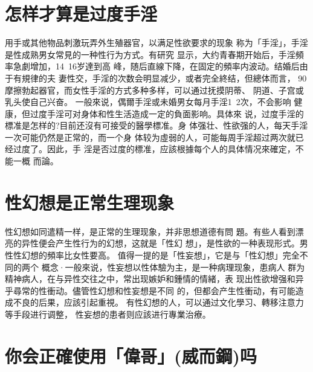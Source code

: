 \documentclass[12pt,UTF8]{ctexbook}
\begin{document}
\section{怎样才算是过度手淫}

用手或其他物品刺激玩弄外生殖器官，以满足性欲要求的现象
称为「手淫」，手淫是性成熟男女常見的一种性行为方式。有研究
显示，大约青春期开始后，手淫頻率急劇增加，14~16岁達到高
峰，随后直線下降，在固定的頻率内波动。结婚后由于有規律的夫
妻性交，手淫的次数会明显减少，或者完全終结，但總体而言，
90%
摩擦勃起器官，而女性手淫的方式多种多样，可以通过抚摸阴蒂、
阴道、子宫或乳头使自己兴奋。
一般來说，偶爾手淫或未婚男女每月手淫1~2次，不会影响
健康，但过度手淫可对身体和性生活造成一定的負面影响。具体來
说，过度手淫的標准是怎样的?目前还沒有可接受的醫學標准。身
体强壮、性欲强的人，每天手淫一次可能仍然是正常的，而一个身
体较为虛弱的人，可能每周手淫超过两次就已经过度了。因此，手
淫是否过度的標准，应該根據每个人的具体情况來確定，不能一概
而論。
\section{性幻想是正常生理现象}
性幻想如同遣精一样，是正常的生理现象，并非思想道德有問
題。有些人看到漂亮的异性便会产生性行为的幻想，这就是「性幻
想」，是性欲的一种表现形式。男性性幻想的頻率比女性要高。
值得一提的是「性妄想」，它是与「性幻想」完全不同的两个
概念·一般來说，性妄想以性体驗为主，是一种病理现象，患病人
群为精神病人，在与异性交往之中，常出现嫉妒和鍾情的情緒，表
现出性欲增强和异乎尋常的性衝动。儘管性幻想和性妄想是不同
的，但都会产生性衝动，有可能造成不良的后果，应該引起重視。
有性幻想的人，可以通过文化學习、轉移注意力等手段进行调整，
性妄想的患者则应該进行專業治療。

\section{你会正確使用「偉哥」(威而鋼)吗}
\end{document}
